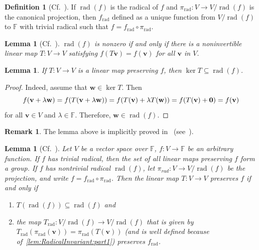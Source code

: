 \documentclass{elsarticle}
\DeclareMathOperator{\rad}{rad}
\DeclareMathOperator{\Ker}{ker}
\def\F{{\mathbb F}}
\theoremstyle{plain}
\newtheorem{lemma}[theorem]{Lemma}
\theoremstyle{definition}
\newtheorem{definition}[theorem]{Definition}
\newtheorem{remark}[theorem]{Remark}
\numberwithin{equation}{section}
\begin{document}
\begin{definition}[Cf.~{\cite[text at the beginning of Section~1]{Waterhouse1983}}]\label{def:frad}If $\rad(f)$ is the radical of $f$ and $\pi_{\rad}\colon V \to V / \rad(f)$ is the canonical projection, then $f_{\rad}$ defined as a unique function from $V / \rad(f)$  to $\F$ with trivial radical such that $f = f_{\rad}\circ \pi_{\rad}$.
\end{definition}

\begin{lemma}[Cf.~{\cite[Proposition~1]{Waterhouse1983}}]\label{lem:RadicalCriterion}
$\rad (f)$ is nonzero if and only if there is a noninvertible linear map $T\colon V\to V$ satisfying $f(T\mathbf v) = f(\mathbf v)$ for all $\mathbf v$ in $V$.
\end{lemma}

\begin{lemma}\label{lem:KernelContainedInRad}If $T\colon V \to V$ is a linear map preserving $f$, then $\Ker T \subseteq \rad(f)$.
\end{lemma}
\begin{proof}Indeed, assume that $\mathbf w \in \Ker T.$ Then
\begin{equation*}
f(\mathbf v + \lambda\mathbf w)= f(T(\mathbf v + \lambda\mathbf w))\\
= f(T(\mathbf v) + \lambda T(\mathbf w)) = f(T(\mathbf v) + \mathbf 0) = f(\mathbf v)
\end{equation*}
for all $\mathbf v \in V$ and $\lambda \in \F$. Therefore, $\mathbf w \in \rad(f)$.
\end{proof}

\begin{remark}The lemma above is implicitly proved in~\cite{Waterhouse1983} (see~\cite[Proposition~1]{Waterhouse1983}).
\end{remark}

\begin{lemma}[Cf.~{\cite[Proposition~2]{Waterhouse1983}}]\label{lem:RadicalInvariant}
Let $V$ be a vector space over $\F$, $f\colon V \to \F$ be an arbitrary function. If $f$ has trivial radical, then the set of all linear maps preserving $f$ form a group. If $f$ has nontrivial radical $\rad(f)$, let $\pi_{rad}\colon V \to V/\rad(f)$ be the projection, and write $f = f_{\rad} \circ \pi_{\rad}$. Then the linear map $T \colon V \to V$ preserves $f$ if and only if
\begin{enumerate}[label=(\alph*), ref=(\alph*)]
\item\label{lem:RadicalInvariant:part1} $T(\rad(f)) \subseteq \rad(f)$  and
\item\label{lem:RadicalInvariant:part2} the map $T_{\rad} \colon V / \rad(f) \to V / \rad(f)$ that is given by $T_{\rad}(\pi_{\rad}(\mathbf v)) = \pi_{\rad}(T(\mathbf v))$ (and is well defined because of~\ref{lem:RadicalInvariant:part1}) preserves $f_{\rad}$.
\end{enumerate}
\end{lemma}
\end{document}

